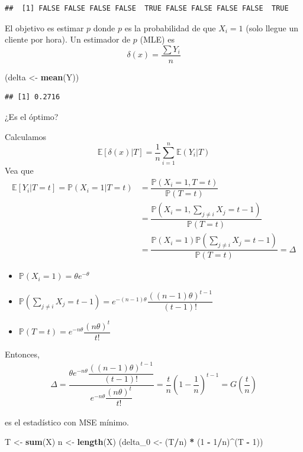 \documentclass[
  12pt,
]{book}
\newenvironment{Shaded}{\begin{snugshade}}{\end{snugshade}}
\newcommand{\DecValTok}[1]{\textcolor[rgb]{0.00,0.00,0.81}{#1}}
\newcommand{\KeywordTok}[1]{\textcolor[rgb]{0.13,0.29,0.53}{\textbf{#1}}}
\newcommand{\NormalTok}[1]{#1}
\newcommand{\OperatorTok}[1]{\textcolor[rgb]{0.81,0.36,0.00}{\textbf{#1}}}
\newcommand{\StringTok}[1]{\textcolor[rgb]{0.31,0.60,0.02}{#1}}
\begin{document}
\begin{verbatim}
##  [1] FALSE FALSE FALSE FALSE  TRUE FALSE FALSE FALSE FALSE  TRUE
\end{verbatim}

El objetivo es estimar \(p\) donde \(p\) es la probabilidad de que \(X_i =1\) (solo llegue un cliente por hora). Un estimador de \(p\) (MLE) es
\[\delta(x) = \dfrac{\sum Y_i}{n}\]

\begin{Shaded}
\begin{Highlighting}[]
\NormalTok{(delta \textless{}{-}}\StringTok{ }\KeywordTok{mean}\NormalTok{(Y))}
\end{Highlighting}
\end{Shaded}

\begin{verbatim}
## [1] 0.2716
\end{verbatim}

¿Es el óptimo?

Calculamos
\[\mathbb E[\delta(x)|T] = \dfrac 1n \sum_{i=1}^n \mathbb E (Y_i|T)\]
Vea que
\begin{align*}
\mathbb E[Y_i|T = t] = \mathbb P(X_i = 1 | T = t) & = \dfrac{\mathbb P(X_i = 1, T=t)}{\mathbb P(T=t)}\\
& = \dfrac{\mathbb P(X_i = 1, \sum_{j\ne i} X_j = t-1)}{\mathbb P(T=t)}\\
& = \dfrac{\mathbb P(X_i = 1) \mathbb P(\sum_{j\ne i} X_j = t-1)}{\mathbb P(T=t)} = \Delta
\end{align*}

\begin{itemize}
\item
  \(\mathbb P(X_i = 1) = \theta e^{-\theta}\)
\item
  \(\mathbb P(\sum_{j\ne i}X_j = t-1) = e^{-(n-1)\theta}\dfrac{((n-1)\theta)^{t-1}}{(t-1)!}\)
\item
  \(\mathbb P(T=t) = e^{-n\theta}\dfrac{(n\theta)^t}{t!}\)
\end{itemize}

Entonces,
\begin{align*}
\Delta = \dfrac{\theta e^{-n\theta}\dfrac{((n-1)\theta)^{t-1}}{(t-1)!}}{e^{-n\theta}\dfrac{(n\theta)^t}{t!}} = \dfrac tn \left(1-\dfrac 1n\right)^{t-1} = G\left(\dfrac tn\right)
\end{align*}

es el estadístico con MSE mínimo.

\begin{Shaded}
\begin{Highlighting}[]
\NormalTok{T \textless{}{-}}\StringTok{ }\KeywordTok{sum}\NormalTok{(X)}
\NormalTok{n \textless{}{-}}\StringTok{ }\KeywordTok{length}\NormalTok{(X)}
\NormalTok{(delta\_}\DecValTok{0}\NormalTok{ \textless{}{-}}\StringTok{ }\NormalTok{(T}\OperatorTok{/}\NormalTok{n) }\OperatorTok{*}\StringTok{ }\NormalTok{(}\DecValTok{1} \OperatorTok{{-}}\StringTok{ }\DecValTok{1}\OperatorTok{/}\NormalTok{n)}\OperatorTok{\^{}}\NormalTok{(T }\OperatorTok{{-}}\StringTok{ }\DecValTok{1}\NormalTok{))}
\end{Highlighting}
\end{Shaded}
\end{document}
